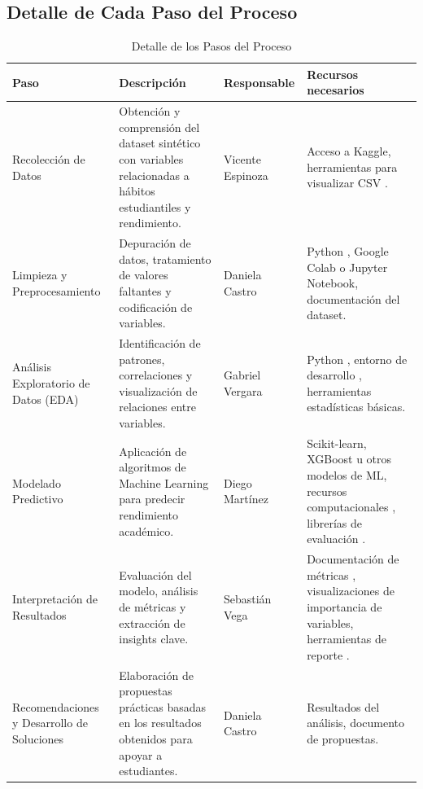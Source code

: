 \documentclass[12pt,letterpaper]{report}
\begin{document}
\subsection{Detalle de Cada Paso del Proceso}

\begin{table}[H]
    \centering
    \renewcommand{\arraystretch}{1.3}
    \begin{tabular}{|p{3cm}|p{5cm}|p{3cm}|p{5cm}|}
        \hline
        \textbf{Paso} & \textbf{Descripción} & \textbf{Responsable} & \textbf{Recursos necesarios} \\
        \hline
        Recolección de Datos &
        Obtención y comprensión del dataset sintético con variables relacionadas a hábitos estudiantiles y rendimiento. &
        Vicente Espinoza &
        Acceso a Kaggle, herramientas para visualizar CSV . \\
        \hline
        Limpieza y Preprocesamiento &
        Depuración de datos, tratamiento de valores faltantes y codificación de variables. &
        Daniela Castro &
        Python , Google Colab o Jupyter Notebook, documentación del dataset. \\
        \hline
        Análisis Exploratorio de Datos (EDA) &
        Identificación de patrones, correlaciones y visualización de relaciones entre variables. &
        Gabriel Vergara &
        Python , entorno de desarrollo , herramientas estadísticas básicas. \\
        \hline
        Modelado Predictivo &
        Aplicación de algoritmos de Machine Learning para predecir rendimiento académico. &
        Diego Martínez &
        Scikit-learn, XGBoost u otros modelos de ML, recursos computacionales , librerías de evaluación . \\
        \hline
        Interpretación de Resultados &
        Evaluación del modelo, análisis de métricas y extracción de insights clave. &
        Sebastián Vega &
        Documentación de métricas , visualizaciones de importancia de variables, herramientas de reporte . \\
        \hline
        Recomendaciones y Desarrollo de Soluciones &
        Elaboración de propuestas prácticas basadas en los resultados obtenidos para apoyar a estudiantes. &
        Daniela Castro &
        Resultados del análisis, documento de propuestas. \\
        \hline
    \end{tabular}
    \caption{Detalle de los Pasos del Proceso}
\end{table}
\end{document}
